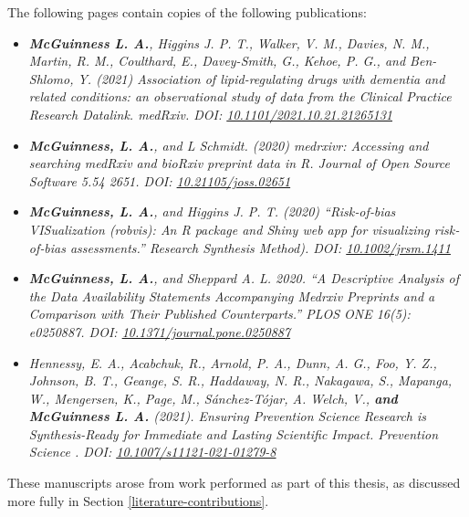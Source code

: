 \documentclass[a4paper, twoside]{templates/ociamthesis}
\newcommand*{\bibtitle}{Bibliography}
\begin{document}
The following pages contain copies of the following publications:

\begin{itemize}
\item
  \emph{\textbf{McGuinness L. A.}, Higgins J. P. T., Walker, V. M., Davies, N. M., Martin, R. M., Coulthard, E., Davey-Smith, G., Kehoe, P. G., and Ben-Shlomo, Y. (2021) Association of lipid-regulating drugs with dementia and related conditions: an observational study of data from the Clinical Practice Research Datalink. medRxiv. DOI: \href{https://doi.org/10.1101/2021.10.21.21265131}{10.1101/2021.10.21.21265131}}
\item
  \emph{\textbf{McGuinness, L. A.}, and L Schmidt. (2020) medrxivr: Accessing and searching medRxiv and bioRxiv preprint data in R. Journal of Open Source Software 5.54 2651. DOI: \href{https://doi.org/10.21105/joss.02651}{10.21105/joss.02651}}
\item
  \emph{\textbf{McGuinness, L. A.}, and Higgins J. P. T. (2020) ``Risk‐of‐bias VISualization (robvis): An R package and Shiny web app for visualizing risk‐of‐bias assessments.'' Research Synthesis Method). DOI: \href{https://doi.org/10.1002/jrsm.1411}{10.1002/jrsm.1411}}
\item
  \emph{\textbf{McGuinness, L. A.}, and Sheppard A. L. 2020. ``A Descriptive Analysis of the Data Availability Statements Accompanying Medrxiv Preprints and a Comparison with Their Published Counterparts.'' PLOS ONE 16(5): e0250887. DOI: \href{https://doi.org/10.1371/journal.pone.0250887}{10.1371/journal.pone.0250887}}
\item
  \emph{Hennessy, E. A., Acabchuk, R., Arnold, P. A., Dunn, A. G., Foo, Y. Z., Johnson, B. T., Geange, S. R., Haddaway, N. R., Nakagawa, S., Mapanga, W., Mengersen, K., Page, M., Sánchez-Tójar, A. Welch, V., \textbf{and McGuinness L. A.} (2021). Ensuring Prevention Science Research is Synthesis-Ready for Immediate and Lasting Scientific Impact. Prevention Science . DOI: \href{https://doi.org/10.1007/s11121-021-01279-8}{10.1007/s11121-021-01279-8}}
\end{itemize}

These manuscripts arose from work performed as part of this thesis, as discussed more fully in Section \ref{literature-contributions}.


\setlength{\baselineskip}{0pt} %

{\renewcommand*\MakeUppercase[1]{#1}%
\printbibliography[heading=bibintoc,title={\bibtitle}]}
\end{document}
